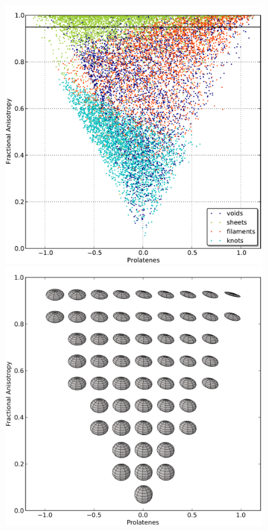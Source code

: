 \documentclass[a4,useAMS,usenatbib,usegraphicx]{latex/mn2e}
\begin{document}
\begin{flushleft}
\begin{figure}
\centering

  \includegraphics[trim = 0mm 1mm 0mm 1mm, clip, keepaspectratio=true,
  width=0.3\textheight]{./figures/FA_Prolatenes_Vweb.pdf}
  \includegraphics[trim = 0mm 1mm 0mm 1mm, clip, keepaspectratio=true,
  width=0.3\textheight]{./figures/FA_Prolatenes.png}  
  

  \label{fig:FAShapeness}
  \vspace{0.1 cm}

\end{figure}
\end{flushleft}
\end{document}
